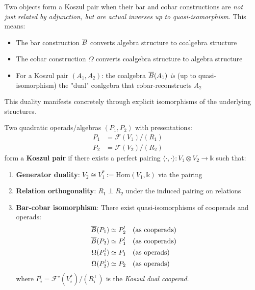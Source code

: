 \begin{principle}
Two objects form a Koszul pair when their bar and cobar constructions are \emph{not just related by adjunction, but are actual inverses up to quasi-isomorphism}. This means:

\begin{itemize}
\item The bar construction $\overline{B}$ converts algebra structure to coalgebra structure
\item The cobar construction $\Omega$ converts coalgebra structure to algebra structure  
\item For a Koszul pair $(A_1, A_2)$: the coalgebra $\overline{B}(A_1)$ \emph{is} (up to quasi-isomorphism) the "dual" coalgebra that cobar-reconstructs $A_2$
\end{itemize}

This duality manifests concretely through explicit isomorphisms of the underlying structures.
\end{principle}

\begin{definition}\label{def:classical-koszul-pair}
Two quadratic operads/algebras $(P_1, P_2)$ with presentations:
\begin{align*}
P_1 &= \mathcal{F}(V_1)/(R_1) \\
P_2 &= \mathcal{F}(V_2)/(R_2)
\end{align*}
form a \textbf{Koszul pair} if there exists a perfect pairing $\langle \cdot, \cdot \rangle: V_1 \otimes V_2 \to \mathbb{k}$ such that:

\begin{enumerate}
\item \textbf{Generator duality}: $V_2 \cong V_1^* := \text{Hom}(V_1, \mathbb{k})$ via the pairing

\item \textbf{Relation orthogonality}: $R_1 \perp R_2$ under the induced pairing on relations

\item \textbf{Bar-cobar isomorphism}: There exist quasi-isomorphisms of cooperads and operads:
\begin{align*}
\overline{B}(P_1) &\simeq P_2^! \quad \text{(as cooperads)} \\
\overline{B}(P_2) &\simeq P_1^! \quad \text{(as cooperads)} \\
\Omega(P_1^!) &\simeq P_1 \quad \text{(as operads)} \\
\Omega(P_2^!) &\simeq P_2 \quad \text{(as operads)}
\end{align*}
where $P_i^! = \mathcal{F}^c(V_i^*)/(R_i^\perp)$ is the \emph{Koszul dual cooperad}.
\end{enumerate}
\end{definition}

